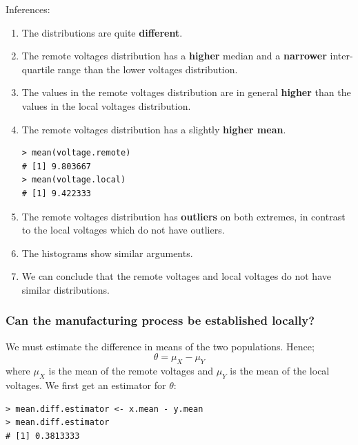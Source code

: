 \documentclass[12pt,letterpaper,titlepage,en-US]{article}
\begin{document}
Inferences:
\begin{enumerate}
\item The distributions are quite\textbf{ different}. 
\item The remote voltages distribution has a \textbf{higher} median and  a \textbf{narrower} inter-quartile range than the lower voltages distribution.
\item The values in the remote voltages distribution are in general \textbf{higher} than the values in the local voltages distribution.
\item The remote voltages distribution has a slightly \textbf{higher mean}.
\begin{knitrout}
\color{fgcolor}
\begin{kframe}
\begin{verbatim}
> mean(voltage.remote)
# [1] 9.803667
> mean(voltage.local)
# [1] 9.422333
\end{verbatim}
\end{kframe}
\end{knitrout}
\item The remote voltages distribution has \textbf{outliers} on both extremes, in contrast to the local voltages which do not have outliers.
\item The histograms show similar arguments.



\item We can conclude that the remote voltages and local voltages do not have similar distributions.
\end{enumerate}

\subsubsection{Can the manufacturing process be established locally?}
We must estimate the difference in means of the two populations. Hence;
\begin{equation}
\theta = \mu_{X} - \mu_{Y}
\end{equation}
where $\mu_{X}$ is the mean of the remote voltages and $\mu_{Y}$ is the mean of the local voltages. We first get an estimator for $\theta$:
\begin{knitrout}
\color{fgcolor}
\begin{kframe}
\begin{verbatim}
> mean.diff.estimator <- x.mean - y.mean
> mean.diff.estimator
# [1] 0.3813333
\end{verbatim}
\end{kframe}
\end{knitrout}
\end{document}
